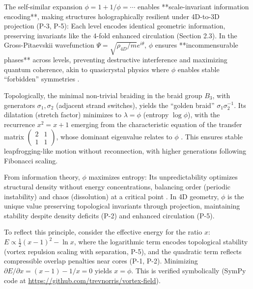 The self-similar expansion $\phi = 1 + 1/\phi = \cdots$ enables **scale-invariant information encoding**, making structures holographically resilient under 4D-to-3D projection (P-3, P-5): Each level encodes identical geometric information, preserving invariants like the 4-fold enhanced circulation (Section 2.3). In the Gross-Pitaevskii wavefunction $\Psi = \sqrt{\rho_{4D}/m} e^{i \theta}$, $\phi$ ensures **incommensurable phases** across levels, preventing destructive interference and maximizing quantum coherence, akin to quasicrystal physics where $\phi$ enables stable “forbidden” symmetries \cite{quasicrystals, entropy_encoding}.

Topologically, the minimal non-trivial braiding in the braid group $B_3$, with generators $\sigma_1, \sigma_2$ (adjacent strand switches), yields the “golden braid” $\sigma_1 \sigma_2^{-1}$. Its dilatation (stretch factor) minimizes to $\lambda = \phi$ (entropy $\log \phi$), with the recurrence $x^2 = x + 1$ emerging from the characteristic equation of the transfer matrix $\begin{pmatrix} 2 & 1 \\ 1 & 1 \end{pmatrix}$, whose dominant eigenvalue relates to $\phi$ \cite{braid_topology}. This ensures stable leapfrogging-like motion without reconnection, with higher generations following Fibonacci scaling.

From information theory, $\phi$ maximizes entropy: Its unpredictability optimizes structural density without energy concentrations, balancing order (periodic instability) and chaos (dissolution) at a critical point \cite{quasicrystals}. In 4D geometry, $\phi$ is the unique value preserving topological invariants through projection, maintaining stability despite density deficits (P-2) and enhanced circulation (P-5).

To reflect this principle, consider the effective energy for the ratio $x$: $E \propto \frac{1}{2} (x - 1)^2 - \ln x$, where the logarithmic term encodes topological stability (vortex repulsion scaling with separation, P-5), and the quadratic term reflects compressible overlap penalties near cores (P-1, P-2). Minimizing $\partial E / \partial x = (x - 1) - 1/x = 0$ yields $x = \phi$. This is verified symbolically (SymPy code at \url{https://github.com/trevnorris/vortex-field}).


